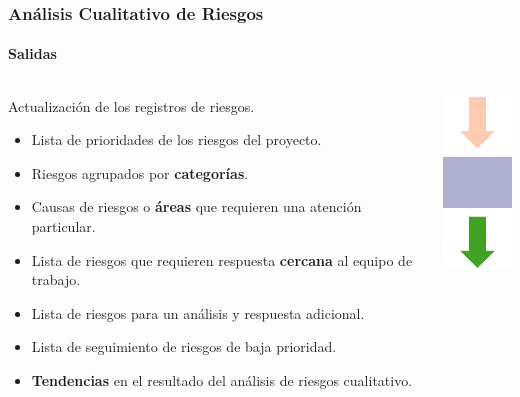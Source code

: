 \frame
{
\frametitle{Análisis Cualitativo de Riesgos}
\framesubtitle{Salidas}
\begin{columns}
	\begin{column}{0.8\textwidth}
		Actualización de los registros de riesgos.
		\begin{itemize}
			\item<1-> Lista de prioridades de los riesgos del proyecto.
			\item<2-> Riesgos agrupados por \textbf{categorías}.
			\item<3-> Causas de riesgos o \textbf{áreas} que requieren una atención particular.
			\item<4-> Lista de riesgos que requieren respuesta \textbf{cercana} al equipo de trabajo.
			\item<5-> Lista de riesgos para un análisis y respuesta adicional.
			\item<6-> Lista de seguimiento de riesgos de baja prioridad.
			\item<7-> \textbf{Tendencias} en el resultado del análisis de riesgos cualitativo.
		\end{itemize}
	\end{column}
	\begin{column}{0.2\textwidth}
		\includegraphics[width=2cm]{img/output}
	\end{column}
\end{columns}
}
